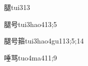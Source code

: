 \begin{verbete}{腿}{tui3}{13}
\end{verbete}
\begin{verbete}{腿号}{tui3hao4}{13;5}
\end{verbete}
\begin{verbete}{腿号箍}{tui3hao4gu1}{13;5;14}
\end{verbete}
\begin{verbete}{唾骂}{tuo4ma4}{11;9}
\end{verbete}

